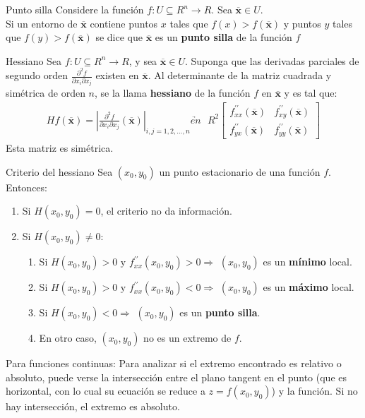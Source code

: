 \documentclass[a4paper, twoside]{article}
\numberwithin{equation}{section}
\numberwithin{figure}{section}
\numberwithin{table}{section}
\newcommand{\vect}[1]{\overline{\textbf{#1}}}
\begin{document}
\begin{definicion*}{Punto silla}
	Considere la función $f:U\subseteq R^n \to R$. Sea $\vect{x} \in U$.\\
	
	Si un entorno de $\vect{x}$ contiene puntos $x$ tales que $f(x) > f(\vect{x})$ y puntos $y$ tales que $f(y) > f(\vect{x})$ se dice que $\vect{x}$ es un \textbf{punto silla} de la función $f$
\end{definicion*}

\begin{definicion*}{Hessiano}
	Sea $f:U\subseteq R^n \to R$, y sea $\vect{x} \in U$. Suponga que las derivadas parciales de segundo orden $\frac{\partial^2 f}{\partial x_i \partial x_j}$ existen en $\vect{x}.$ Al determinante de la matriz cuadrada y simétrica de orden $n$, se la llama \textbf{hessiano} de la función $f$ en $\vect{x}$ y es tal que:
	\begin{align}
		Hf(\vect{x})=\left|\frac{\partial^2 f}{\partial x_i \partial x_j }\left(\vect{x}\right)\right|_{i,j=1,2,\ldots,n}\underrightarrow{en} \text{ } R^2\left[\begin{array}{cc}
		f_{xx}^{\prime\prime}\left(\vect{x}\right) & f_{xy}^{\prime\prime}\left(\vect{x}\right)\\
		f_{yx}^{\prime\prime}\left(\vect{x}\right) & f_{yy}^{\prime\prime}\left(\vect{x}\right)\end{array}\right]
	\end{align}
	Esta matriz es simétrica.
\end{definicion*}

\begin{teorema*}{Criterio del hessiano}
	Sea $(x_0,y_0)$ un punto estacionario de una función $f$. Entonces:
	\begin{enumerate}
		\item Si $H(x_0,y_0)=0$, el criterio no da información.
		\item Si $H(x_0,y_0)\ne0:$
		\begin{enumerate}
			\item Si $H(x_0,y_0)>0\mbox{ y }f_{xx}^{\prime\prime}(x_0,y_0)>0\Longrightarrow$	$(x_{0},y_{0})$ es un \textbf{mínimo} local.
			\item Si $H(x_0,y_0)>0\mbox{ y }f_{xx}^{\prime\prime}(x_0,y_0)<0\Longrightarrow$	$(x_{0},y_{0})$ es un \textbf{máximo} local.
			\item Si $H(x_0,y_0)<0\Longrightarrow$ $(x_0,y_0)$	es un \textbf{punto silla}.
			\item En otro caso, $(x_0,y_0)$ no es un extremo de $f$.
		\end{enumerate}
	\end{enumerate}
	Para funciones continuas: Para analizar si el extremo encontrado es relativo o absoluto, puede verse la intersección entre el plano tangent en el punto (que es horizontal, con lo cual su ecuación se reduce a $z=f(x_0,y_0)$) y la función. Si no hay intersección, el extremo es absoluto.
\end{teorema*}
\end{document}
